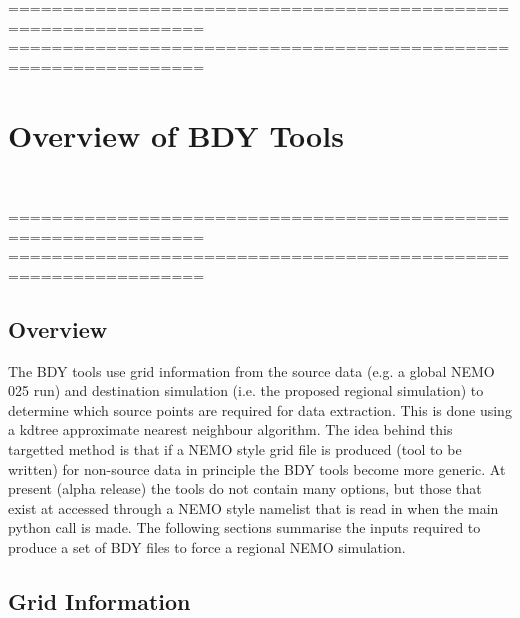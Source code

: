 %
================================================================
%
================================================================
\chapter{Overview of BDY Tools }
\label{setup}

$\ $\newline    %



%
\noindent ================================================================
%
================================================================

\section{Overview}


The BDY tools use grid information from the source data (e.g. a global NEMO 025
run) and destination simulation (i.e. the proposed regional simulation) to determine which source points are
required for data extraction. This is done using a kdtree approximate nearest
neighbour algorithm. The idea behind this targetted method is that if a NEMO
style grid file is produced (tool to be written) for non-\NEMO source data in principle the BDY tools 
become more generic. At present (alpha release) the tools do not contain many
options, but those that exist at accessed through a NEMO style namelist that is read in
when the main python call is made. The following sections summarise the inputs 
required to produce a set of BDY files to force a regional NEMO simulation.

\section{Grid Information}
\label{s_coord}

